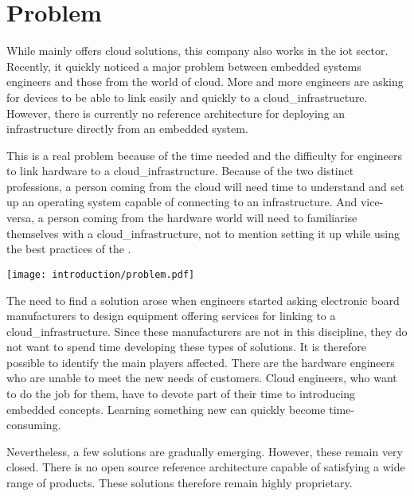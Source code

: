 \section{Problem}

While  mainly offers \gls{cloud} solutions, this company also works in the \acrfull{iot} sector. Recently, it quickly noticed a major problem between embedded systems engineers and those from the world of \gls{cloud}. More and more engineers are asking for devices to be able to link easily and quickly to a \gls{cloud_infrastructure}. However, there is currently no reference architecture for deploying an infrastructure directly from an embedded system.

This is a real problem because of the time needed and the difficulty for engineers to link hardware to a \gls{cloud_infrastructure}. Because of the two distinct professions, a person coming from the \gls{cloud} will need time to understand and set up an operating system capable of connecting to an infrastructure. And vice-versa, a person coming from the hardware world will need to familiarise themselves with a \gls{cloud_infrastructure}, not to mention setting it up while using the best practices of the .
\begin{center}
    \begingroup
    \texttt{[image: introduction/problem.pdf]}
    \label{fig:enterprise_logo}
    \endgroup
\end{center}
The need to find a solution arose when engineers started asking electronic board manufacturers to design equipment offering services for linking to a \gls{cloud_infrastructure}. Since these manufacturers are not in this discipline, they do not want to spend time developing these types of solutions. It is therefore possible to identify the main players affected. There are the hardware engineers who are unable to meet the new needs of customers. Cloud engineers, who want to do the job for them, have to devote part of their time to introducing embedded concepts. Learning something new can quickly become time-consuming.

Nevertheless, a few solutions are gradually emerging. However, these remain very closed. There is no open source reference architecture capable of satisfying a wide range of products. These solutions therefore remain highly proprietary.


